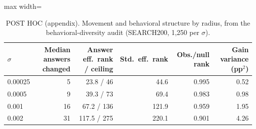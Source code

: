 \begin{table}[t]
\centering
\small
\begin{adjustbox}{max width=\linewidth}
\begin{tabular}{lrrrrr}
\toprule
$\sigma$ & Median answers changed & Answer eff.\ rank / ceiling & Std.\ eff.\ rank & Obs./null rank & Gain variance (pp$^2$) \\
\midrule
0.00025 & 5 & 23.8 / 46 & 44.6 & 0.995 & 0.52 \\
0.0005 & 9 & 39.3 / 73 & 69.4 & 0.983 & 0.98 \\
0.001 & 16 & 67.2 / 136 & 121.9 & 0.959 & 1.95 \\
0.002 & 31 & 117.5 / 275 & 220.1 & 0.901 & 4.26 \\
\bottomrule
\end{tabular}
\end{adjustbox}
\caption{POST HOC (appendix). Movement and behavioral structure by radius, from the behavioral-diversity audit (SEARCH200, 1,250 per $\sigma$).}
\label{tab:radius-behavior}
\end{table}
